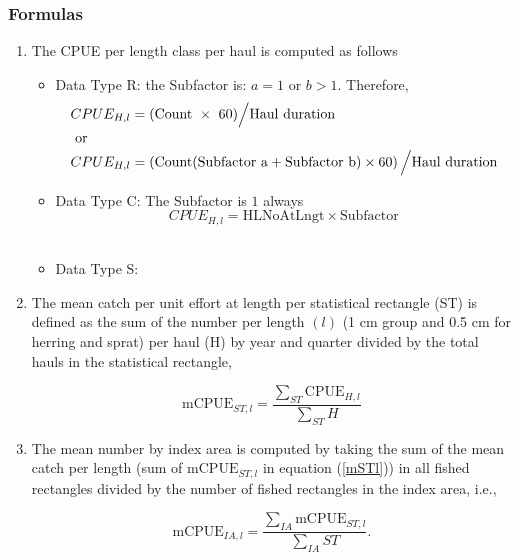 \documentclass[useAMS,referee]{biom}
\numberwithin{equation}{section}
\begin{document}
\subsubsection{Formulas}
\begin{enumerate}


\item The CPUE per length class per haul is computed as follows\\

\begin{itemize}
\item Data Type R: the Subfactor is: $a =1$ or $b > 1$. Therefore,
\begin{align}
 CPUE_{H,l}  & = \mathrm{(Count \ \times \ 60) \Big/ Haul \ duration} \nonumber \\
\intertext{ or}
  CPUE_{H,l} & = \mathrm{\left(Count(Subfactor \ a + Subfactor \ b) \times 60\right) \Big/ Haul \ duration} \nonumber \\
\end{align}

 \item { Data Type C}: The Subfactor is $1$ always 
  $$ CPUE_{H,l} = \mathrm{HLNoAtLngt \times  Subfactor}$$\\  
  \item Data Type S: \\
\end{itemize}


\item The mean catch per unit effort at length per statistical rectangle (ST) is defined as the sum of the number per length $(l)$  (1 cm group and 0.5 cm for herring and sprat) per haul (H) by year and quarter divided by the total hauls in the statistical rectangle, 

\begin{equation}
\mathrm{mCPUE}_{ST, l} = \frac{\sum_{ST}\mathrm{CPUE}_{H,l}}{\sum_{ST} H}
\label{mSTl}
\end{equation}

\item The mean number by index area is computed by taking the sum of the mean catch per  length (sum of $\mathrm{mCPUE}_{ST, l}$ in equation (\ref{mSTl})) in all fished rectangles divided by the number of fished rectangles in the index area, i.e.,

\begin{equation}
\mathrm{mCPUE}_{IA, l} = \frac{\sum_{IA}\mathrm{mCPUE}_{ST,l}}{\sum_{IA} ST}.
\label{mIAl}
\end{equation}

\end{enumerate}
%
\end{document}
